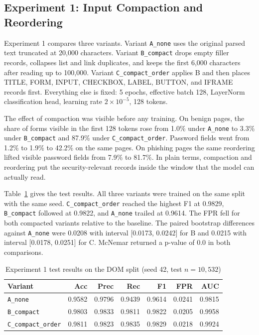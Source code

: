 \documentclass{FastFyp}
\begin{document}
\subsection{Experiment 1: Input Compaction and Reordering}
\label{subsec:exp1}

Experiment 1 compares three variants. Variant \texttt{A\_none} uses the original parsed text truncated at 20{,}000 characters. Variant \texttt{B\_compact} drops empty filler records, collapses list and link duplicates, and keeps the first 6{,}000 characters after reading up to 100{,}000. Variant \texttt{C\_compact\_order} applies B and then places TITLE, FORM, INPUT, CHECKBOX, LABEL, BUTTON, and IFRAME records first. Everything else is fixed: 5 epochs, effective batch 128, LayerNorm classification head, learning rate $2\times10^{-5}$, 128 tokens.

The effect of compaction was visible before any training. On benign pages, the share of forms visible in the first 128 tokens rose from 1.0\% under \texttt{A\_none} to 3.3\% under \texttt{B\_compact} and 87.9\% under \texttt{C\_compact\_order}. Password fields went from 1.2\% to 1.9\% to 42.2\% on the same pages. On phishing pages the same reordering lifted visible password fields from 7.9\% to 81.7\%. In plain terms, compaction and reordering put the security-relevant records inside the window that the model can actually read.

Table~\ref{tab:exp1} gives the test results. All three variants were trained on the same split with the same seed. \texttt{C\_compact\_order} reached the highest F1 at 0.9829, \texttt{B\_compact} followed at 0.9822, and \texttt{A\_none} trailed at 0.9614. The FPR fell for both compacted variants relative to the baseline. The paired bootstrap differences against \texttt{A\_none} were 0.0208 with interval [0.0173, 0.0242] for B and 0.0215 with interval [0.0178, 0.0251] for C. McNemar returned a p-value of 0.0 in both comparisons.

\begin{table}[htbp]
\centering
\caption{Experiment 1 test results on the DOM split (seed 42, test $n=10{,}532$)}
\label{tab:exp1}
\begin{tabular}{lrrrrrr}
\hline
Variant & Acc & Prec & Rec & F1 & FPR & AUC \\
\hline
\texttt{A\_none} & 0.9582 & 0.9796 & 0.9439 & 0.9614 & 0.0241 & 0.9815 \\
\texttt{B\_compact} & 0.9803 & 0.9833 & 0.9811 & 0.9822 & 0.0205 & 0.9958 \\
\texttt{C\_compact\_order} & 0.9811 & 0.9823 & 0.9835 & 0.9829 & 0.0218 & 0.9924 \\
\hline
\end{tabular}
\end{table}
\end{document}
